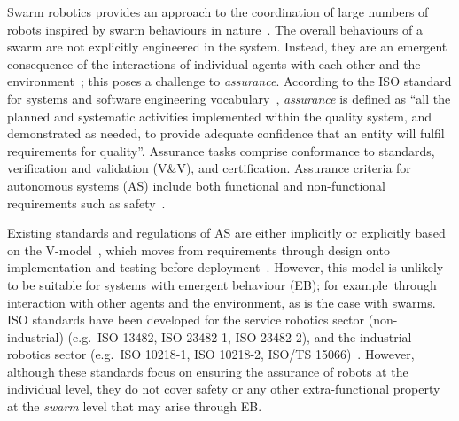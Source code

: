 \documentclass[runningheads]{llncs}
\begin{document}
Swarm robotics provides an approach to the coordination of large numbers of robots inspired by swarm behaviours in nature~\cite{Sahin2005}. 
The overall behaviours of a swarm are not explicitly engineered in the system. Instead, they are an emergent consequence of the interactions of individual agents with each other and the environment~\cite{Abeywickrama2022}; this poses a challenge to \emph{assurance}. 
According to the ISO standard for systems and software engineering vocabulary~\cite{ISO24765:2017}, \emph{assurance} is defined as ``all the planned and systematic activities implemented within the quality system, and demonstrated as needed, to provide adequate confidence that an entity will fulfil requirements for quality''. 
Assurance tasks comprise conformance to standards, verification and validation (V\&V), and certification. Assurance criteria for autonomous systems (AS) include both functional and non-functional requirements such as safety~\cite{Cheng2014}. 

Existing standards and regulations of AS are either implicitly or explicitly based on the V-model~\cite{Forsberg:1992}, which moves from requirements through design onto implementation and testing before deployment~\cite{Jia2021,Fisher2020}. 
However, this model is unlikely to be suitable for systems with emergent behaviour (EB); for example\ through interaction with other agents and the environment, as is the case with swarms. 
ISO standards have been developed for the service robotics sector (non-industrial) (e.g.\ ISO 13482, ISO 23482-1, ISO 23482-2), and the industrial robotics sector (e.g.\ ISO 10218-1, ISO 10218-2, ISO/TS 15066)~\cite{Abeywickrama2022}. 
However, although these %
standards focus on ensuring the assurance of robots at the individual level, they do not cover safety or any other extra-functional property at the \emph{swarm} level that may arise through EB. %
\end{document}
